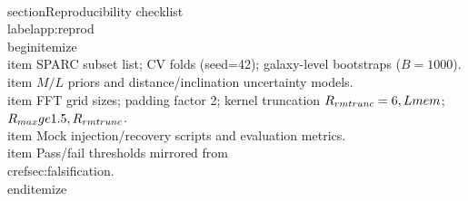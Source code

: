 \documentclass[11pt,a4paper]{article}
\newcommand{\Lmem}{L}       %
\begin{document}
\\section{Reproducibility checklist}\\label{app:reprod}
\\begin{itemize}
  \\item SPARC subset list; CV folds (seed=42); galaxy-level bootstraps ($B=1000$).
  \\item $M/L$ priors and distance/inclination uncertainty models.
  \\item FFT grid sizes; padding factor 2; kernel truncation $R_{\\rm trunc}=6\\,\\Lmem$; $R_{\\max}\\ge 1.5\\,R_{\\rm trunc}$.
  \\item Mock injection/recovery scripts and evaluation metrics.
  \\item Pass/fail thresholds mirrored from \\cref{sec:falsification}.
\\end{itemize}

\
\

\
\end{document}
